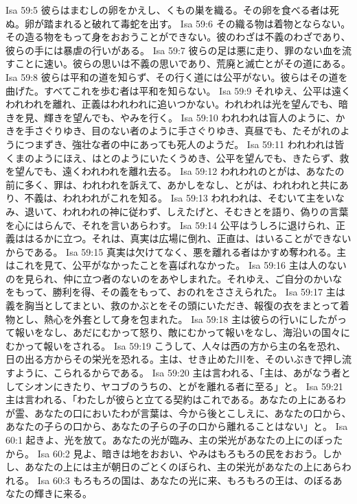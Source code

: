 Isa 59:5  彼らはまむしの卵をかえし、くもの巣を織る。その卵を食べる者は死ぬ。卵が踏まれると破れて毒蛇を出す。
Isa 59:6  その織る物は着物とならない。その造る物をもって身をおおうことができない。彼のわざは不義のわざであり、彼らの手には暴虐の行いがある。
Isa 59:7  彼らの足は悪に走り、罪のない血を流すことに速い。彼らの思いは不義の思いであり、荒廃と滅亡とがその道にある。
Isa 59:8  彼らは平和の道を知らず、その行く道には公平がない。彼らはその道を曲げた。すべてこれを歩む者は平和を知らない。
Isa 59:9  それゆえ、公平は遠くわれわれを離れ、正義はわれわれに追いつかない。われわれは光を望んでも、暗きを見、輝きを望んでも、やみを行く。
Isa 59:10  われわれは盲人のように、かきを手さぐりゆき、目のない者のように手さぐりゆき、真昼でも、たそがれのようにつまずき、強壮な者の中にあっても死人のようだ。
Isa 59:11  われわれは皆くまのようにほえ、はとのようにいたくうめき、公平を望んでも、きたらず、救を望んでも、遠くわれわれを離れ去る。
Isa 59:12  われわれのとがは、あなたの前に多く、罪は、われわれを訴えて、あかしをなし、とがは、われわれと共にあり、不義は、われわれがこれを知る。
Isa 59:13  われわれは、そむいて主をいなみ、退いて、われわれの神に従わず、しえたげと、そむきとを語り、偽りの言葉を心にはらんで、それを言いあらわす。
Isa 59:14  公平はうしろに退けられ、正義ははるかに立つ。それは、真実は広場に倒れ、正直は、はいることができないからである。
Isa 59:15  真実は欠けてなく、悪を離れる者はかすめ奪われる。主はこれを見て、公平がなかったことを喜ばれなかった。
Isa 59:16  主は人のないのを見られ、仲に立つ者のないのをあやしまれた。それゆえ、ご自分のかいなをもって、勝利を得、その義をもって、おのれをささえられた。
Isa 59:17  主は義を胸当としてまとい、救のかぶとをその頭にいただき、報復の衣をまとって着物とし、熱心を外套として身を包まれた。
Isa 59:18  主は彼らの行いにしたがって報いをなし、あだにむかって怒り、敵にむかって報いをなし、海沿いの国々にむかって報いをされる。
Isa 59:19  こうして、人々は西の方から主の名を恐れ、日の出る方からその栄光を恐れる。主は、せき止めた川を、そのいぶきで押し流すように、こられるからである。
Isa 59:20  主は言われる、「主は、あがなう者としてシオンにきたり、ヤコブのうちの、とがを離れる者に至る」と。
Isa 59:21  主は言われる、「わたしが彼らと立てる契約はこれである。あなたの上にあるわが霊、あなたの口においたわが言葉は、今から後とこしえに、あなたの口から、あなたの子らの口から、あなたの子らの子の口から離れることはない」と。
Isa 60:1  起きよ、光を放て。あなたの光が臨み、主の栄光があなたの上にのぼったから。
Isa 60:2  見よ、暗きは地をおおい、やみはもろもろの民をおおう。しかし、あなたの上には主が朝日のごとくのぼられ、主の栄光があなたの上にあらわれる。
Isa 60:3  もろもろの国は、あなたの光に来、もろもろの王は、のぼるあなたの輝きに来る。
